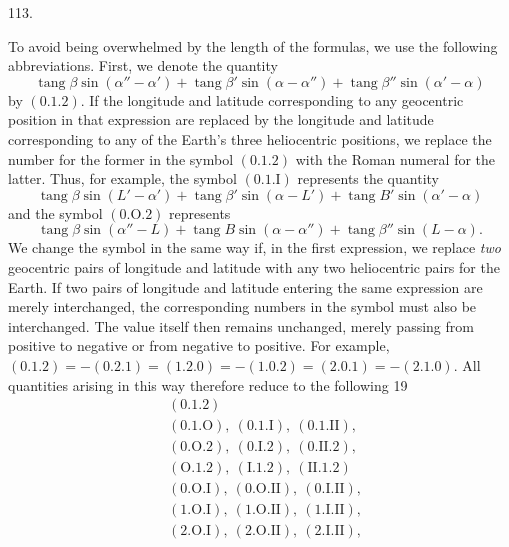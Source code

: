 \par{}\medskip
{}
\begin{center}113.\end{center}
To avoid being overwhelmed by the length of the formulas, we use the following abbreviations. First, we denote the quantity
\[
\operatorname{tang}\beta\sin(\alpha''-\alpha')+\operatorname{tang}\beta'\sin(\alpha-\alpha'')+\operatorname{tang}\beta''\sin(\alpha'-\alpha)
\]
by $(0.1.2)$. If the longitude and latitude corresponding to any geocentric position in that expression are replaced by the longitude and latitude corresponding to any of the Earth's three heliocentric positions, we replace the number for the former in the symbol $(0.1.2)$ with the Roman numeral for the latter. Thus, for example, the symbol $(0.1.\mathrm{I})$ represents the quantity
\[
\operatorname{tang}\beta\sin(L'-\alpha')+\operatorname{tang}\beta'\sin(\alpha-L')+\operatorname{tang}B'\sin(\alpha'-\alpha)
\]
and the symbol $(0.\mathrm{O}.2)$ represents
\[
\operatorname{tang}\beta\sin(\alpha''-L)+\operatorname{tang}B\sin(\alpha-\alpha'')+\operatorname{tang}\beta''\sin(L-\alpha).
\]
We change the symbol in the same way if, in the first expression, we replace \emph{two} geocentric pairs of longitude and latitude with any two heliocentric pairs for the Earth. If two pairs of longitude and latitude entering the same expression are merely interchanged, the corresponding numbers in the symbol must also be interchanged. The value itself then remains unchanged, merely passing from positive to negative or from negative to positive. For example, $(0.1.2)=-(0.2.1)=(1.2.0)=-(1.0.2)=(2.0.1)=-(2.1.0)$. All quantities arising in this way therefore reduce to the following 19
\[
\begin{aligned}
&(0.1.2)\\
&(0.1.\mathrm{O}),\ (0.1.\mathrm{I}),\ (0.1.\mathrm{II}),\\
&(0.\mathrm{O}.2),\ (0.\mathrm{I}.2),\ (0.\mathrm{II}.2),\\
&(\mathrm{O}.1.2),\ (\mathrm{I}.1.2),\ (\mathrm{II}.1.2)\\
&(0.\mathrm{O}.\mathrm{I}),\ (0.\mathrm{O}.\mathrm{II}),\ (0.\mathrm{I}.\mathrm{II}),\\
&(1.\mathrm{O}.\mathrm{I}),\ (1.\mathrm{O}.\mathrm{II}),\ (1.\mathrm{I}.\mathrm{II}),\\
&(2.\mathrm{O}.\mathrm{I}),\ (2.\mathrm{O}.\mathrm{II}),\ (2.\mathrm{I}.\mathrm{II}),
\end{aligned}
\]

